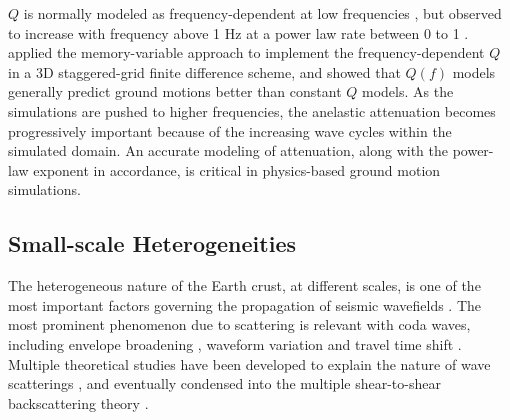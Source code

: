 $Q$ is normally modeled as frequency-dependent at low frequencies \citep{akiQuantitativeSeismology2002}, but observed to increase with frequency above 1 Hz at a power law rate between 0 to 1 . \citet{withersMemoryEfficientSimulation2015} applied the memory-variable approach \citep{day1984numerical,emmerich1987incorporation,blanch1995modeling} to implement the frequency-dependent $Q$ in a 3D staggered-grid finite difference scheme, and showed that $Q(f)$ models generally predict ground motions better than constant $Q$ models. As the simulations are pushed to higher frequencies, the anelastic attenuation becomes progressively important because of the increasing wave cycles within the simulated domain. An accurate modeling of attenuation, along with the power-law exponent in accordance, is critical in physics-based ground motion simulations.

\subsection{Small-scale Heterogeneities}

The heterogeneous nature of the Earth crust, at different scales, is one of the most important factors governing the propagation of seismic wavefields \citep{levanderSmallscaleHeterogeneityLargescale1992,levanderCrustHeterogeneousOptical1994,beanStatisticalMeasuresCrustal1999,helffrichEarthMantle2001,hedlinSeismicEvidenceSmallscale1997}. The most prominent phenomenon due to scattering is relevant with coda waves, including envelope broadening \citep{satoBroadeningSeismogramEnvelopes1989}, waveform variation and travel time shift \citep{flatteSmallscaleStructureLithosphere1988}. Multiple theoretical studies have been developed to explain the nature of wave scatterings \citep{akiAnalysisSeismicCoda1969, wuMultipleScatteringEnergy1985,akiOriginCodaWaves1975}, and eventually condensed into the multiple shear-to-shear backscattering theory \citep{zengScatteringWaveEnergy1991,zengTheoryScatteredSwave1993,zengSubeventRakeRandom1995}.

